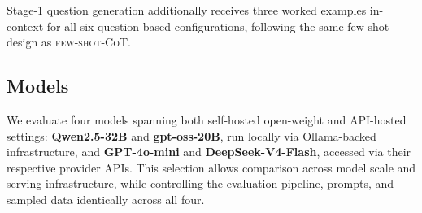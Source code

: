 Stage-1 question generation additionally receives three worked examples
in-context for all six question-based configurations, following the same
few-shot design as \textsc{few-shot-CoT}.

\subsection{Models}
\label{sec:models}

We evaluate four models spanning both self-hosted open-weight and API-hosted
settings: \textbf{Qwen2.5-32B} and \textbf{gpt-oss-20B}, run locally via
Ollama-backed infrastructure, and \textbf{GPT-4o-mini} and
\textbf{DeepSeek-V4-Flash}, accessed via their respective provider APIs. This
selection allows comparison across model scale and serving infrastructure,
while controlling the evaluation pipeline, prompts, and sampled data
identically across all four.
